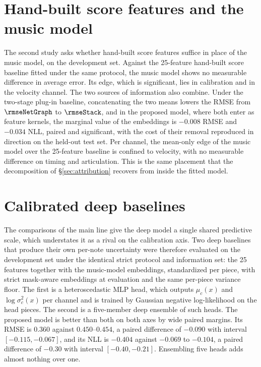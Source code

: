 
\section{Hand-built score features and the music model}
The second study asks whether hand-built score features suffice in place of
the music model, on the development set. Against the 25-feature hand-built
score baseline fitted under the same protocol, the music model shows no
measurable difference in average error. Its edge, which is significant,
lies in calibration and in the velocity channel. The two sources of
information also combine. Under the two-stage plug-in baseline,
concatenating the two means lowers the RMSE from $\rmseNetGraph$ to
$\rmseStack$, and in the proposed model, where both enter as feature
kernels, the marginal value of the embeddings is $-0.008$ RMSE and $-0.034$
NLL, paired and significant, with the cost of their removal reproduced in
direction on the held-out test set. Per channel, the mean-only edge of the
music model over the 25-feature baseline is confined to velocity, with no
measurable difference on timing and articulation. This is the same
placement that the decomposition of \S\ref{sec:attribution} recovers from
inside the fitted model.

\section{Calibrated deep baselines}
The comparisons of the main line give the deep model a single shared
predictive scale, which understates it as a rival on the calibration axis.
Two deep baselines that produce their own per-note uncertainty were
therefore evaluated on the development set under the identical strict
protocol and information set: the 25 features together with the music-model
embeddings, standardized per piece, with strict mask-aware embeddings at
evaluation and the same per-piece variance floor. The first is a
heteroscedastic MLP head, which outputs $\mu_c(x)$ and $\log\sigma_c^2(x)$
per channel and is trained by Gaussian negative log-likelihood on the head
pieces. The second is a five-member deep ensemble of such heads. The
proposed model is better than both on both axes by wide paired margins. Its
RMSE is $0.360$ against $0.450$--$0.454$, a paired difference of $-0.090$
with interval $[-0.115, -0.067]$, and its NLL is $-0.404$ against $-0.069$
to $-0.104$, a paired difference of $-0.30$ with interval $[-0.40, -0.21]$.
Ensembling five heads adds almost nothing over one.

